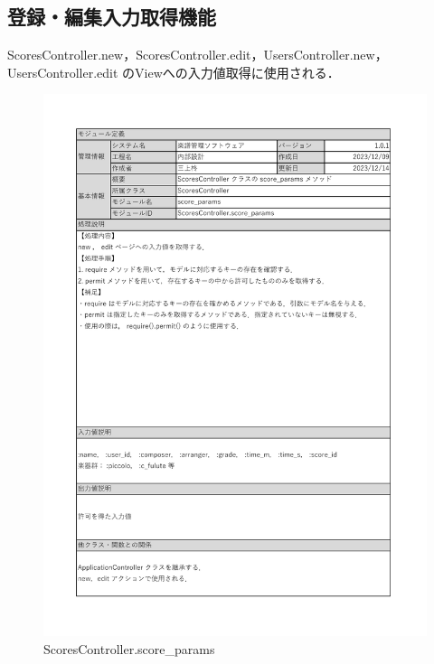 \subsection*{登録・編集入力取得機能}
ScoresController.new，ScoresController.edit，UsersController.new，UsersController.edit
のViewへの入力値取得に使用される．
\begin{figure}[H]
    \centering
    \includegraphics[scale=0.5]{img/Method/score_params.pdf}
    \caption{ScoresController.score\_params}
\end{figure}
